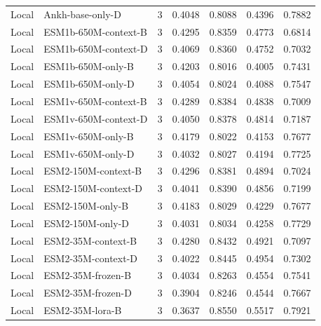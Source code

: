 \begin{longtable}{@{}P{1.35cm}P{5.3cm}rrrrr@{}}
Local & Ankh-\allowbreak{}base-\allowbreak{}only-\allowbreak{}D & 3 & 0.4048 & 0.8088 & 0.4396 & 0.7882 \\
Local & ESM1b-\allowbreak{}650M-\allowbreak{}context-\allowbreak{}B & 3 & 0.4295 & 0.8359 & 0.4773 & 0.6814 \\
Local & ESM1b-\allowbreak{}650M-\allowbreak{}context-\allowbreak{}D & 3 & 0.4069 & 0.8360 & 0.4752 & 0.7032 \\
Local & ESM1b-\allowbreak{}650M-\allowbreak{}only-\allowbreak{}B & 3 & 0.4203 & 0.8016 & 0.4005 & 0.7431 \\
Local & ESM1b-\allowbreak{}650M-\allowbreak{}only-\allowbreak{}D & 3 & 0.4054 & 0.8024 & 0.4088 & 0.7547 \\
Local & ESM1v-\allowbreak{}650M-\allowbreak{}context-\allowbreak{}B & 3 & 0.4289 & 0.8384 & 0.4838 & 0.7009 \\
Local & ESM1v-\allowbreak{}650M-\allowbreak{}context-\allowbreak{}D & 3 & 0.4050 & 0.8378 & 0.4814 & 0.7187 \\
Local & ESM1v-\allowbreak{}650M-\allowbreak{}only-\allowbreak{}B & 3 & 0.4179 & 0.8022 & 0.4153 & 0.7677 \\
Local & ESM1v-\allowbreak{}650M-\allowbreak{}only-\allowbreak{}D & 3 & 0.4032 & 0.8027 & 0.4194 & 0.7725 \\
Local & ESM2-\allowbreak{}150M-\allowbreak{}context-\allowbreak{}B & 3 & 0.4296 & 0.8381 & 0.4894 & 0.7024 \\
Local & ESM2-\allowbreak{}150M-\allowbreak{}context-\allowbreak{}D & 3 & 0.4041 & 0.8390 & 0.4856 & 0.7199 \\
Local & ESM2-\allowbreak{}150M-\allowbreak{}only-\allowbreak{}B & 3 & 0.4183 & 0.8029 & 0.4229 & 0.7677 \\
Local & ESM2-\allowbreak{}150M-\allowbreak{}only-\allowbreak{}D & 3 & 0.4031 & 0.8034 & 0.4258 & 0.7729 \\
Local & ESM2-\allowbreak{}35M-\allowbreak{}context-\allowbreak{}B & 3 & 0.4280 & 0.8432 & 0.4921 & 0.7097 \\
Local & ESM2-\allowbreak{}35M-\allowbreak{}context-\allowbreak{}D & 3 & 0.4022 & 0.8445 & 0.4954 & 0.7302 \\
Local & ESM2-\allowbreak{}35M-\allowbreak{}frozen-\allowbreak{}B & 3 & 0.4034 & 0.8263 & 0.4554 & 0.7541 \\
Local & ESM2-\allowbreak{}35M-\allowbreak{}frozen-\allowbreak{}D & 3 & 0.3904 & 0.8246 & 0.4544 & 0.7667 \\
Local & ESM2-\allowbreak{}35M-\allowbreak{}lora-\allowbreak{}B & 3 & 0.3637 & 0.8550 & 0.5517 & 0.7921 \\

\end{longtable}
